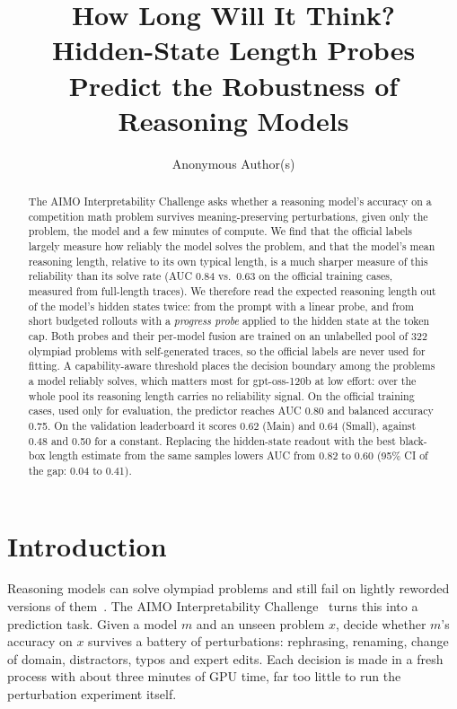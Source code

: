 \documentclass{article}
\title{How Long Will It Think?\\Hidden-State Length Probes Predict the Robustness of Reasoning Models}
\author{Anonymous Author(s)}
\begin{document}
\maketitle

\begin{abstract}
The AIMO Interpretability Challenge asks whether a reasoning model's accuracy on a competition math problem survives meaning-preserving perturbations, given only the problem, the model and a few minutes of compute.
We find that the official labels largely measure how reliably the model solves the problem, and that the model's mean reasoning length, relative to its own typical length, is a much sharper measure of this reliability than its solve rate (AUC 0.84 vs.\ 0.63 on the official training cases, measured from full-length traces).
We therefore read the expected reasoning length out of the model's hidden states twice: from the prompt with a linear probe, and from short budgeted rollouts with a \emph{progress probe} applied to the hidden state at the token cap.
Both probes and their per-model fusion are trained on an unlabelled pool of 322 olympiad problems with self-generated traces, so the official labels are never used for fitting.
A capability-aware threshold places the decision boundary among the problems a model reliably solves, which matters most for gpt-oss-120b at low effort: over the whole pool its reasoning length carries no reliability signal.
On the official training cases, used only for evaluation, the predictor reaches AUC 0.80 and balanced accuracy 0.75. On the validation leaderboard it scores 0.62 (Main) and 0.64 (Small), against 0.48 and 0.50 for a constant.
Replacing the hidden-state readout with the best black-box length estimate from the same samples lowers AUC from 0.82 to 0.60 (95\% CI of the gap: 0.04 to 0.41).
\end{abstract}

\section{Introduction}

Reasoning models can solve olympiad problems and still fail on lightly reworded versions of them~\citep{mirzadeh2025gsmsymbolic}.
The AIMO Interpretability Challenge~\citep{stefanik2026aimointerp} turns this into a prediction task.
Given a model $m$ and an unseen problem $x$, decide whether $m$'s accuracy on $x$ survives a battery of perturbations: rephrasing, renaming, change of domain, distractors, typos and expert edits.
Each decision is made in a fresh process with about three minutes of GPU time, far too little to run the perturbation experiment itself.
\end{document}
